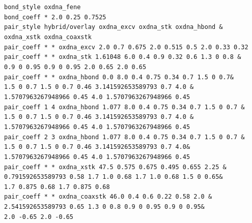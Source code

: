 \documentclass[12pt,onecolumn]{article}
\begin{document}
\smallskip
\texttt{bond\_style oxdna\_fene\\
bond\_coeff * 2.0 0.25 0.7525\\
pair\_style hybrid/overlay oxdna\_excv oxdna\_stk oxdna\_hbond \&\\
\hspace*{0.75cm}oxdna\_xstk oxdna\_coaxstk\\
pair\_coeff * * oxdna\_excv   2.0 0.7 0.675 2.0 0.515 0.5 2.0 0.33 0.32\\
pair\_coeff * * oxdna\_stk    1.61048 6.0 0.4 0.9 0.32 0.6 1.3 0 0.8 \&\\
\hspace*{0.75cm}0.9 0 0.95 0.9 0 0.95 2.0 0.65 2.0 0.65\\
pair\_coeff * * oxdna\_hbond  0.0 8.0 0.4 0.75 0.34 0.7 1.5 0 0.7\&\\
\hspace*{0.75cm}1.5 0 0.7 1.5 0 0.7 0.46 3.141592653589793 0.7 4.0 \&\\
\hspace*{0.75cm}1.5707963267948966 0.45 4.0 1.5707963267948966 0.45\\
pair\_coeff 1 4 oxdna\_hbond  1.077 8.0 0.4 0.75 0.34 0.7 1.5 0 0.7 \&\\
\hspace*{0.75cm}1.5 0 0.7 1.5 0 0.7 0.46 3.141592653589793 0.7 4.0 \&\\
\hspace*{0.75cm}1.5707963267948966 0.45 4.0 1.5707963267948966 0.45\\
pair\_coeff 2 3 oxdna\_hbond  1.077 8.0 0.4 0.75 0.34 0.7 1.5 0 0.7 \&\\
\hspace*{0.75cm}1.5 0 0.7 1.5 0 0.7 0.46 3.141592653589793 0.7 4.0\&\\
\hspace*{0.75cm}1.5707963267948966 0.45 4.0 1.5707963267948966 0.45\\
pair\_coeff * * oxdna\_xstk   47.5 0.575 0.675 0.495 0.655 2.25 \&\\
\hspace*{0.75cm}0.791592653589793 0.58 1.7 1.0 0.68 1.7 1.0 0.68 1.5 0 0.65\&\\
\hspace*{0.75cm}1.7 0.875 0.68 1.7 0.875 0.68\\
pair\_coeff * * oxdna\_coaxstk 46.0 0.4 0.6 0.22 0.58 2.0 \&\\
\hspace*{0.75cm}2.541592653589793 0.65 1.3 0 0.8 0.9 0 0.95 0.9 0 0.95\&\\
\hspace*{0.75cm}2.0 -0.65 2.0 -0.65\\
}
\smallskip
\end{document}
